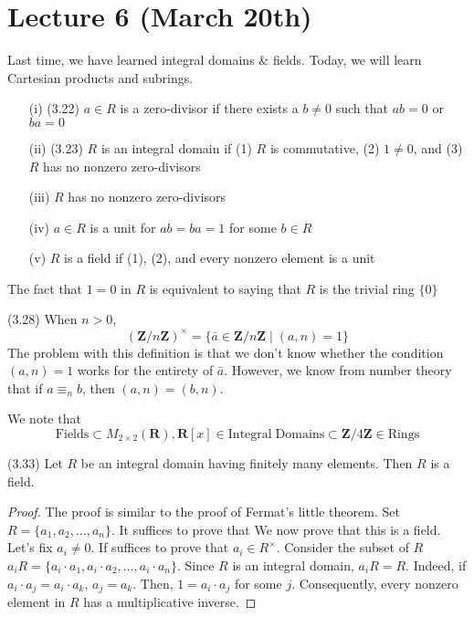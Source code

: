 \section{Lecture 6 (March 20th)}
Last time, we have learned integral domains \& fields. Today, we will learn Cartesian products and subrings. 
\begin{recall}
\begin{itemize}
	\item[(i)] (3.22) $a\in R$ is a zero-divisor if there exists a $b\ne 0$ such that $ab=0$ or $ba=0$
	\item[(ii)] (3.23) $R$ is an integral domain if (1) $R$ is commutative, (2) $1\ne 0$, and (3) $R$ has no nonzero zero-divisors
	\item[(iii)] $R$ has no nonzero zero-divisors
	\item[(iv)] $a\in R$ is a unit for $ab=ba=1$ for some $b\in R$
	\item[(v)] $R$ is a field if (1), (2), and every nonzero element is a unit
\end{itemize}
\end{recall}
\vspace{2ex}
\begin{rmk}
The fact that $1=0$ in $R$ is equivalent to saying that $R$ is the trivial ring $\{0\}$
\end{rmk}
\vspace{2ex}
\begin{prop}
 (3.28) When $n>0$, 
 \[({\bm Z}/n{\bm Z})^{\times }=\{\bar{a}\in {\bm Z}/n{\bm Z} \;|\; (a,n)=1\}\]
The problem with this definition is that we don't know whether the condition $(a,n)=1$ works for the entirety of $\bar{a}$. However, we know from number theory that if $a\equiv_{n}b$, then $(a,n)=(b,n)$. 
\end{prop}
\vspace{2ex}
\begin{rmk}
We note that
\[\mathrm{Fields}\subset M_{2\times 2}({\bm R}),{\bm R}[x]\in \mathrm{Integral\;Domains}\subset {\bm Z}/4{\bm Z}\in  \mathrm{Rings}\]
\end{rmk}
\vspace{2ex}
\begin{prop}
 (3.33) Let $R$ be an integral domain having finitely many elements. Then $R$ is a field.
\end{prop}
\vspace{2ex}
\begin{proof}
The proof is similar to the proof of Fermat's little theorem. Set $R=\{a_1,a_2,\ldots ,a_{n}\}$. It suffices to prove that We now prove that this is a field. Let's fix $a_{i}\ne 0$. If suffices to prove that $a_{i}\in R^{\times }$. Consider the subset of $R$ $a_{i}R=\{a_{i}\cdot a_1,a_{i}\cdot a_2,\ldots ,a_{i}\cdot a_{n}\}$. Since $R$ is an integral domain, $a_{i}R=R$. Indeed, if $a_{i}\cdot a_{j}=a_{i}\cdot a_{k}$, $a_{j}=a_{k}$. Then, $1=a_{i}\cdot a_{j}$ for some $j$. Consequently, every nonzero element in $R$ has a multiplicative inverse.
\end{proof}
